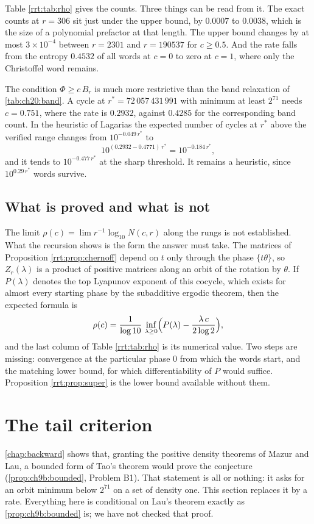 Table \ref{rrt:tab:rho} gives the counts. Three things can be read from it. The exact counts at $r=306$ sit just under the upper bound, by $0.0007$ to $0.0038$, which is the size of a polynomial prefactor at that length. The upper bound changes by at most $3\times10^{-4}$ between $r=2301$ and $r=190537$ for $c\ge0.5$. And the rate falls from the entropy $0.4532$ of all words at $c=0$ to zero at $c=1$, where only the Christoffel word remains.

The condition $\Phi\ge c\,B_r$ is much more restrictive than the band relaxation of \cref{tab:ch20:band}. A cycle at $r^\ast=72\,057\,431\,991$ with minimum at least $2^{71}$ needs $c=0.751$, where the rate is $0.2932$, against $0.4285$ for the corresponding band count. In the heuristic of Lagarias the expected number of cycles at $r^\ast$ above the verified range changes from $10^{-0.049\,r^\ast}$ to
\[
10^{(0.2932-0.4771)\,r^\ast}=10^{-0.184\,r^\ast},
\]
and it tends to $10^{-0.477\,r^\ast}$ at the sharp threshold. It remains a heuristic, since $10^{0.29\,r^\ast}$ words survive.

\subsection{What is proved and what is not}
The limit $\rho(c)=\lim r^{-1}\log_{10}N(c,r)$ along the rungs is not established. What the recursion shows is the form the answer must take. The matrices of Proposition \ref{rrt:prop:chernoff} depend on $t$ only through the phase $\{t\theta\}$, so $Z_r(\lambda)$ is a product of positive matrices along an orbit of the rotation by $\theta$. If $P(\lambda)$ denotes the top Lyapunov exponent of this cocycle, which exists for almost every starting phase by the subadditive ergodic theorem, then the expected formula is
\[
\rho(c)=\frac{1}{\log 10}\,\inf_{\lambda\ge 0}\Bigl(P(\lambda)-\frac{\lambda\,c}{2\log 2}\Bigr),
\]
and the last column of Table \ref{rrt:tab:rho} is its numerical value. Two steps are missing: convergence at the particular phase $0$ from which the words start, and the matching lower bound, for which differentiability of $P$ would suffice. Proposition \ref{rrt:prop:super} is the lower bound available without them.


\section{The tail criterion}\label{rrt:sec:tail}

\cref{chap:backward} shows that, granting the positive density theorems of Mazur and Lau, a bounded form of Tao's theorem would prove the conjecture (\cref{prop:ch9b:bounded}, Problem B1). That statement is all or nothing: it asks for an orbit minimum below $2^{71}$ on a set of density one. This section replaces it by a rate. Everything here is conditional on Lau's theorem exactly as \cref{prop:ch9b:bounded} is; we have not checked that proof.


